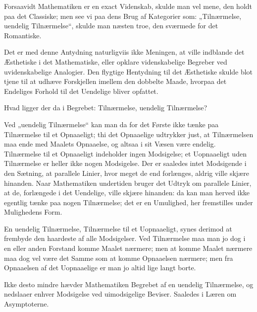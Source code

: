 \documentclass[12pt]{book}
\newcommand{\opage}[1]{\marginnote{\footnotesize\textit{[#1]}}}
\begin{document}
Forsaavidt Mathematiken er en exact Videnskab, skulde man vel mene, den holdt paa
det Classiske; men see vi paa dens Brug af Kategorier som: „Tilnærmelse, uendelig
Tilnærmelse“, skulde man næsten troe, den sværmede for det Romantiske.

Det er med denne Antydning naturligviis ikke Meningen, at ville indblande det
Æsthetiske i det Mathematiske, eller opklare videnskabelige Begreber ved
uvidenskabelige Analogier. Den flygtige Hentydning til det Æsthetiske skulde blot
tjene til at udhæve Forskjellen imellem den dobbelte
\opage{25} Maade, hvorpaa det Endeliges Forhold til det Uendelige bliver opfattet.

Hvad ligger der da i Begrebet: Tilnærmelse, uendelig Tilnærmelse?

Ved „uendelig Tilnærmelse“ kan man da for det Første ikke tænke paa Tilnærmelse
til et Opnaaeligt; thi det Opnaaelige udtrykker just, at Tilnærmelsen maa ende med
Maalets Opnaaelse, og altsaa i sit Væsen være endelig. Tilnærmelse til et
Opnaaeligt indeholder ingen Modsigelse; et Uopnaaeligt uden Tilnærmelse er heller
ikke nogen Modsigelse. Der er saaledes intet Modsigende i den Sætning, at
parallele Linier, hvor meget de end forlænges, aldrig ville skjære hinanden. Naar
Mathematiken undertiden bruger det Udtryk om parallele Linier, at de, forlængede
i det Uendelige, ville skjære hinanden: da kan man herved ikke egentlig tænke paa
nogen Tilnærmelse; det er en Umulighed, her fremstilles under Mulighedens Form.

En uendelig Tilnærmelse, Tilnærmelse til et Uopnaaeligt, synes derimod at
frembyde den haardeste af alle Modsigelser. Ved Tilnærmelse maa man jo dog i en
eller anden Forstand komme Maalet nærmere; men at komme Maalet nærmere maa dog vel
være det Samme som at komme Opnaaelsen nærmere; men fra Opnaaelsen af det
Uopnaaelige er man jo altid lige langt borte.

Ikke desto mindre hævder Mathematiken Begrebet af en uendelig Tilnærmelse, og
nedslaaer enhver Modsigelse ved uimodsigelige Beviser. Saaledes i Læren om
Asymptoterne.
\end{document}
